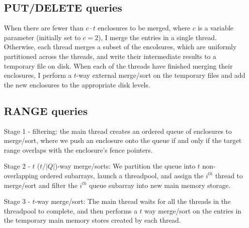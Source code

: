 \documentclass{acm}
\begin{document}
\subsection{PUT/DELETE queries}

When there are fewer than $c\cdot t$ enclosures to be merged, where $c$ is a variable parameter (initially set to $c=2$), I merge the entries in a single thread. Otherwise, each thread merges a subset of the encolsures, which are uniformly partitioned across the threads, and write their intermediate results to a temporary file on disk. When each of the threads have finished merging their enclosures, I perform a $t$-way external merge/sort on the temporary files and add the new enclosures to the appropriate disk levels.

\subsection{RANGE queries}

Stage 1 - filtering: the main thread creates an ordered queue of enclosures to merge/sort, where we push an enclosure onto the queue if and only if the target range overlaps with the enclosure's fence pointers.

Stage 2 - $t$ ($t/|Q|$)-way merge/sorts: We partition the queue into $t$ non-overlapping ordered subarrays, launch a threadpool, and assign the $i^{th}$ thread to merge/sort and filter the $i^{th}$ queue subarray into new main memory storage.

Stage 3 - $t$-way merge/sort: The main thread waits for all the threads in the threadpool to complete, and then performs a $t$ way merge/sort on the entries in the temporary main memory stores created by each thread.
\end{document}

